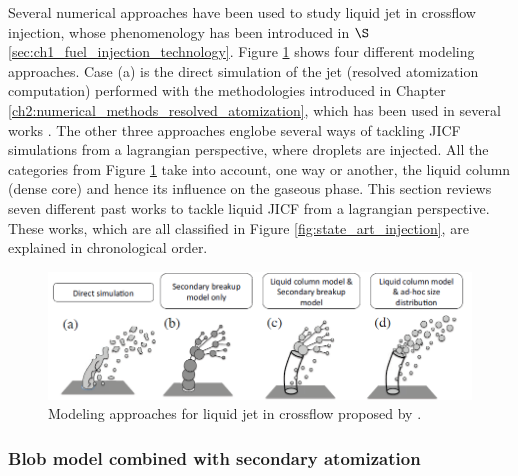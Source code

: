 Several numerical approaches have been used to study liquid jet in crossflow injection, whose phenomenology has been introduced in $\S$\ref{sec:ch1_fuel_injection_technology}. Figure \ref{fig:jaegle_jicf_modeling_approaches} shows four different modeling approaches.  Case (a) is the direct simulation of the jet (resolved atomization computation) performed with the methodologies introduced in Chapter \ref{ch2:numerical_methods_resolved_atomization}, which has been used in several works  . The other three approaches englobe several ways of tackling JICF simulations from a lagrangian perspective, where droplets are injected. All the categories from Figure \ref{fig:jaegle_jicf_modeling_approaches} take into account, one way or another, the liquid column (dense core) and hence its influence on the gaseous phase. This section reviews seven different past works to tackle liquid JICF from a lagrangian perspective. These works, which are all classified in Figure \ref{fig:state_art_injection}, are explained in chronological order. 

\clearpage

\begin{figure}[ht]
    \centering
    \includegraphics[width=1.0\textwidth]{./part1_numerical_approaches/figures_ch3/modelling_approaches_JICF_Jaegle}
       \centering
    \caption{Modeling approaches for liquid jet in crossflow proposed by .}
    \label{fig:jaegle_jicf_modeling_approaches}
\end{figure}


\subsubsection*{Blob model combined with secondary atomization }



